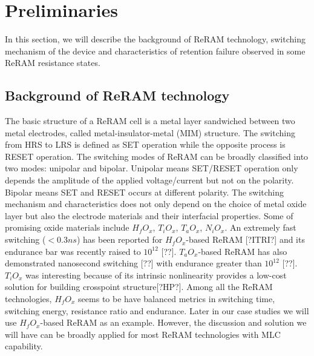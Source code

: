 \section{Preliminaries} \label{sec:preliminary}

In this section, we will describe the background of ReRAM technology, switching mechanism of the device and characteristics of retention failure observed in some ReRAM resistance states.

\subsection{Background of ReRAM technology}
The basic structure of a ReRAM cell is a metal layer sandwiched between two metal electrodes, called metal-insulator-metal (MIM) structure. The switching from HRS to LRS is defined as SET operation while the opposite process is RESET operation. The switching modes of ReRAM can be broadly classified into two modes: unipolar and bipolar. Unipolar means SET/RESET operation only depends the amplitude of the applied voltage/current but not on the polarity. Bipolar means SET and RESET occurs at different polarity. The switching mechanism and characteristics does not only depend on the choice of metal oxide layer but also the electrode materials and their interfacial properties. Some of promising oxide materials include $H_fO_x$, $T_iO_x$, $T_aO_x$, $N_iO_x$. An extremely fast switching ($<0.3ns$) has been reported for $H_fO_x$-based ReRAM [?ITRI?] and its endurance bar was recently raised to $10^{12}$ [??]. $T_aO_x$-based ReRAM has also demonstrated nanosecond switching [??] with endurance greater than $10^{12}$ [??]. $T_iO_x$ was interesting because of its intrinsic nonlinearity provides a low-cost solution for building crosspoint structure[?HP?]. Among all the ReRAM technologies, $H_fO_x$ seems to be have balanced metrics in switching time, switching energy, resistance ratio and endurance. Later in our case studies we will use $H_fO_x$-based ReRAM as an example. However, the discussion and solution we will have can be broadly applied for most ReRAM technologies with MLC capability.

